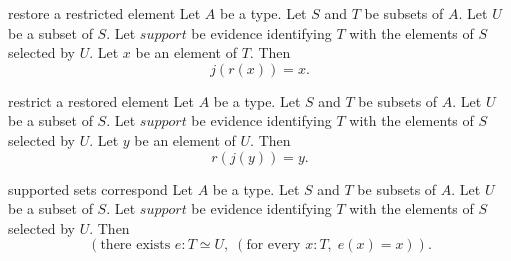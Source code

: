 \begin{cleanresult}{restore a restricted element}
Let $A$ be a type.
Let $S$ and $T$ be subsets of $A$.
Let $U$ be a subset of $S$.
Let $\mathit{support}$ be evidence identifying $T$ with the elements of $S$ selected by $U$.
Let $x$ be an element of $T$.
Then \[j(r(x))=x.\]
\end{cleanresult}

\begin{cleanresult}{restrict a restored element}
Let $A$ be a type.
Let $S$ and $T$ be subsets of $A$.
Let $U$ be a subset of $S$.
Let $\mathit{support}$ be evidence identifying $T$ with the elements of $S$ selected by $U$.
Let $y$ be an element of $U$.
Then \[r(j(y))=y.\]
\end{cleanresult}

\begin{cleanresult}{supported sets correspond}
Let $A$ be a type.
Let $S$ and $T$ be subsets of $A$.
Let $U$ be a subset of $S$.
Let $\mathit{support}$ be evidence identifying $T$ with the elements of $S$ selected by $U$.
Then \[\left(\text{there exists }e : T\simeq U,\; \left(\text{for every }x : T,\; e(x)=x\right)\right).\]
\end{cleanresult}

